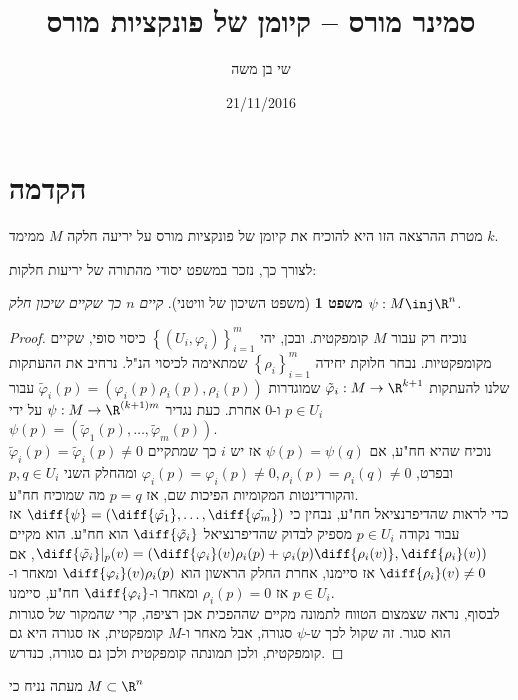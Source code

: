 \documentclass{article}
\title{סמינר מורס – קיומן של פונקציות מורס}
\author{שי בן משה}
\date{21/11/2016}
\newtheorem*{theorem*}{משפט}
\theoremstyle{definition}
\begin{document}
	\maketitle
	
	
	
	
	\section{הקדמה}
	
	מטרת ההרצאה הזו היא להוכיח את קיומן של פונקציות מורס על יריעה חלקה \(M\) ממימד \(k\).
	
	לצורך כך, נזכר במשפט יסודי מהתורה של יריעות חלקות:
	\begin{theorem*}[משפט השיכון של וויטני]
		קיים \(n\) כך שקיים שיכון חלק
		\(\psi: M \inj \R^n\).
	\end{theorem*}
	\begin{proof}
		נוכיח רק עבור \(M\) קומפקטית.
		ובכן, יהי
		\(\left\{\left(U_i,\varphi_i\right)\right\}_{i=1}^m\)
		כיסוי סופי, שקיים מקומפקטיות.
		נבחר חלוקת יחידה
		\(\left\{\rho_i\right\}_{i=1}^m\)
		שמתאימה לכיסוי הנ"ל.
		נרחיב את ההעתקות שלנו להעתקות
		\(\tilde{\varphi}_i: M \to \R^{k+1}\)
		שמוגדרות
		\(\tilde{\varphi}_i(p) = \left(\varphi_i(p)\rho_i(p),\rho_i(p)\right)\)
		עבור
		\(p \in U_i\)
		ו-\(0\) אחרת.
		כעת נגדיר
		\(\psi: M \to \R^{(k+1)m}\)
		על ידי
		\(
			\psi(p)=\left(\tilde{\varphi}_1(p),\dotsc,\tilde{\varphi}_m(p)\right)
		\).
		\\
		נוכיח שהיא חח"ע, אם
		\(\psi(p)=\psi(q)\)
		אז יש \(i\) כך שמתקיים
		\(\tilde{\varphi}_i(p)=\tilde{\varphi}_i(p)\neq 0\)
		ובפרט,
		\(\varphi_i(p)=\varphi_i(p)\neq 0,\rho_i(p)=\rho_i(q)\neq 0\)
		ומהחלק השני
		\(p,q \in U_i\)
		והקורדינטות המקומיות הפיכות שם, אז
		\(p=q\)
		מה שמוכיח חח"ע.
		\\
		כדי לראות שהדיפרנציאל חח"ע, נבחין כי
		\(\diff{\psi}=\left(\diff{\tilde{\varphi_1}},\dotsc,\diff{\tilde{\varphi_m}}\right)\)
		אז עבור נקודה
		\(p\in U_i\)
		מספיק לבדוק שהדיפרנציאל
		\(\diff{\tilde{\varphi_i}}\)
		הוא חח"ע.
		הוא מקיים
		\(
			\diff{\tilde{\varphi_i}}|_p(v)
			=\left(
				\diff{\varphi_i}(v)\rho_i(p) + \varphi_i(p)\diff{\rho_i(v)},
				\diff{\rho_i}(v)
			\right)
		\),
		אם
		\(\diff{\rho_i}(v)\neq 0\)
		אז סיימנו, אחרת החלק הראשון הוא
		\(\diff{\varphi_i}(v)\rho_i(p)\)
		ומאחר ו-\(p\in U_i\) אז
		\(\rho_i(p)=0\)
		ומאחר ו-\(\diff{\varphi_i}\) חח"ע, סיימנו.
		\\
		לבסוף, נראה שצמצום הטווח לתמונה מקיים שההפכית אכן רציפה,
		קרי שהמקור של סגורות הוא סגור.
		זה שקול לכך ש-\(\psi\) סגורה,
		אבל מאחר ו-\(M\) קומפקטית, אז סגורה היא גם קומפקטית,
		ולכן תמונתה קומפקטית ולכן גם סגורה, כנדרש.
	\end{proof}
	מעתה נניח כי
	\(M \subset \R^n\)
	
\end{document}
